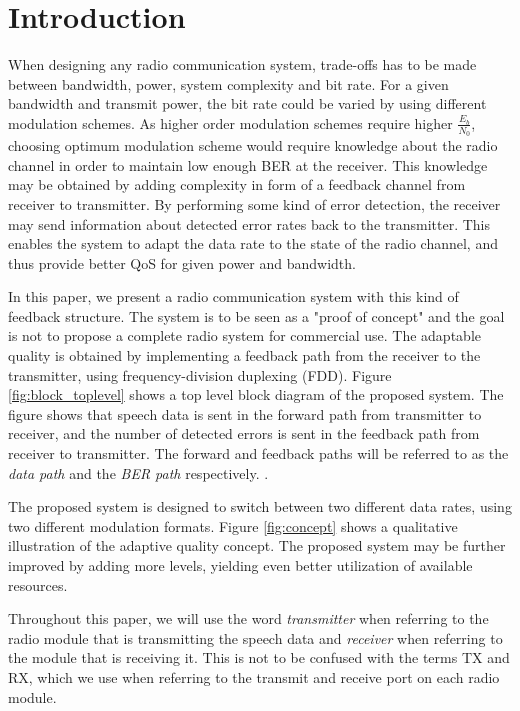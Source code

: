 \section{Introduction}
\label{sec:Introduction}
When designing any radio communication system, trade-offs has to be made between bandwidth, power, system complexity and bit rate. For a given bandwidth and transmit power, the bit rate could be varied by using different modulation schemes. As higher order modulation schemes require higher $\frac{E_b}{N_0}$, choosing optimum modulation scheme would require knowledge about the radio channel in order to maintain low enough BER at the receiver. This knowledge may be obtained by adding complexity in form of a feedback channel from receiver to transmitter. By performing some kind of error detection, the receiver may send information about detected error rates back to the transmitter. This enables the system to adapt the data rate to the state of the radio channel, and thus provide better QoS for given power and bandwidth. 

In this paper, we present a radio communication system with this kind of feedback structure. The system is to be seen as a "proof of concept" and the goal is not to propose a complete radio system for commercial use. The adaptable quality is obtained by implementing a feedback path from the receiver to the transmitter, using frequency-division duplexing (FDD). Figure \ref{fig:block_toplevel} shows a top level block diagram of the proposed system. The figure shows that speech data is sent in the forward path from transmitter to receiver, and the number of detected errors is sent in the feedback path from receiver to transmitter. The forward and feedback paths will be referred to as the \textit{data path} and the \textit{BER path} respectively. 
. 

The proposed system is designed to switch between two different data rates, using two different modulation formats. Figure \ref{fig:concept} shows a qualitative illustration of the adaptive quality concept. The proposed system may be further improved by adding more levels, yielding even better utilization of available resources.



Throughout this paper, we will use the word \textit{transmitter} when referring to the radio module that is transmitting the speech data and \textit{receiver} when referring to the module that is receiving it. This is not to be confused with the terms TX and RX, which we use when referring to the transmit and receive port on each radio module. 

